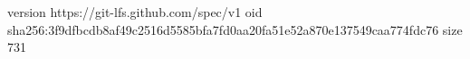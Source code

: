 version https://git-lfs.github.com/spec/v1
oid sha256:3f9dfbcdb8af49c2516d5585bfa7fd0aa20fa51e52a870e137549caa774fdc76
size 731
